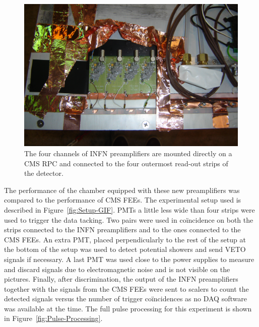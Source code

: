 	\begin{figure}[H]
		\centering
		\includegraphics[width=0.8\plotwidth]{fig/chapt6/INFN-Preamp-2013.JPG}
		\caption{\label{fig:INFN-preamp} The four channels of INFN preamplifiers are mounted directly on a CMS RPC and connected to the four outermost read-out strips of the detector.}
	\end{figure}
	
	The performance of the chamber equipped with these new preamplifiers was compared to the performance of CMS FEEs. The experimental setup used is described in Figure~\ref{fig:Setup-GIF}. PMTs a little less wide than four strips were used to trigger the data tacking. Two pairs were used in coïncidence on both the strips connected to the INFN preamplifiers and to the ones connected to the CMS FEEs. An extra PMT, placed perpendicularly to the rest of the setup at the bottom of the setup was used to detect potential showers and send VETO signals if necessary. A last PMT was used close to the power supplies to measure and discard signals due to electromagnetic noise and is not visible on the pictures. Finally, after discrimination, the output of the INFN preamplifiers together with the signals from the CMS FEEs were sent to scalers to count the detected signals versus the number of trigger coïncidences as no DAQ software was available at the time. The full pulse processing for this experiment is shown in Figure~\ref{fig:Pulse-Processing}.
	 
